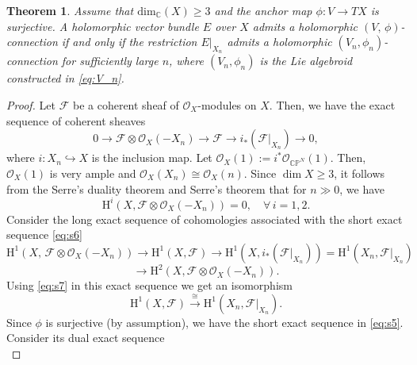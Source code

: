 \documentclass[10pt,a4paper]{amsart}
\newtheorem{theorem}{Theorem}
\begin{document}
\begin{theorem}\label{thm:main}
Assume that $\mathrm{dim}_{\mathbb{C}} (X)  \geq  3$ and the anchor map $\phi  :  V  \longrightarrow 
TX$ is surjective. A holomorphic vector bundle $E$ over $X$ admits a holomorphic $(V,\,\phi)$-connection if
and only if the restriction $E\big\vert_{X_n}$ admits a holomorphic $(V_n, \phi_n)$-connection
for sufficiently large $n$, where $(V_n, \phi_n)$ is the Lie algebroid constructed in \eqref{eq:V_n}.
\end{theorem}

\begin{proof} 
Let $\mathcal{F}$ be a coherent sheaf of $\mathcal{O}_X$-modules on $X$. Then, we have the exact
sequence of coherent sheaves
\begin{equation} \label{eq:s6}
0 \longrightarrow \mathcal{F} \otimes \mathcal{O}_X(-X_n) \longrightarrow
\mathcal{F} \longrightarrow i_*\left( \mathcal{F}\big\vert_{X_n} \right) \longrightarrow 0,
\end{equation}
where $ i :  X_n  \hookrightarrow   X$ is the inclusion map. Let $\mathcal{O}_X(1)
:= i^* \mathcal{O}_{\mathbb{CP}^N} (1)$. Then, $\mathcal{O}_X(1)$ is very ample and $\mathcal{O}_X(X_n)
 \cong  \mathcal{O}_X(n)$. Since
$\dim X \geq  3$, it follows from the Serre's duality theorem \cite[Theorem 7.6, p.~243]{Ha} and Serre's theorem
\cite[Theorem 5.2, p.~228]{Ha} that for $n  \gg  0$, we have
\begin{equation} \label{eq:s7}
\mathrm{H}^i\left(X,  \mathcal{F} \otimes \mathcal{O}_X(-X_n) \right)  =  0, \quad \forall\,  i  = 1,  2.
\end{equation}
Consider the long exact sequence of cohomologies associated with the short exact sequence
\eqref{eq:s6}
$$
\mathrm{H}^1\left(X,\, \mathcal{F} \otimes \mathcal{O}_X(-X_n) \right) 
 \longrightarrow  \mathrm{H}^1(X,  \mathcal{F})  \longrightarrow
\mathrm{H}^1\left(X,  i_*\left( \mathcal{F}\big\vert_{X_n} \right)\right)  = 
\mathrm{H}^1\left(X_n, \mathcal{F}\big\vert_{X_n}\right)\,$$
$$
\longrightarrow 
\mathrm{H}^2\left(X, \mathcal{F} \otimes \mathcal{O}_X(-X_n) \right).
$$
Using \eqref{eq:s7} in this exact sequence we get an isomorphism
\begin{equation} \label{eq:s8}
\mathrm{H}^1(X, \mathcal{F})  \xrightarrow{\, \cong \,}
\mathrm{H}^1\left(X_n, \mathcal{F}\big\vert_{X_n}\right).
\end{equation}
Since $\phi$ is surjective (by assumption), we have the short exact sequence in \eqref{eq:s5}. Consider
its dual exact sequence
\begin{equation}

\end{equation}
\end{proof}
\end{document}
